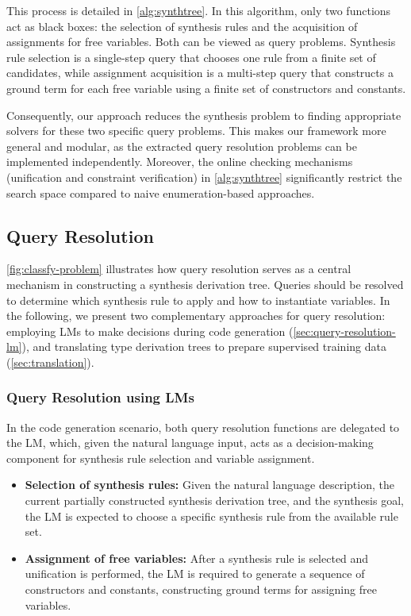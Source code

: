 This process is detailed in \autoref{alg:synthtree}. In this algorithm, only two functions act as black boxes: the selection of synthesis rules and the acquisition of assignments for free variables. Both can be viewed as query problems. Synthesis rule selection is a single-step query that chooses one rule from a finite set of candidates, while assignment acquisition is a multi-step query that constructs a ground term for each free variable using a finite set of constructors and constants.

Consequently, our approach reduces the synthesis problem to finding appropriate solvers for these two specific query problems. This makes our framework more general and modular, as the extracted query resolution problems can be implemented independently. 
Moreover, the online checking mechanisms (unification and constraint verification) in \autoref{alg:synthtree} significantly restrict the search space compared to naive enumeration-based approaches. 

\subsection{Query Resolution}
\autoref{fig:classfy-problem} illustrates how query resolution serves as a central mechanism in constructing a synthesis derivation tree. Queries should be resolved to determine which synthesis rule to apply and how to instantiate variables. In the following, we present two complementary approaches for query resolution: employing LMs to make decisions during code generation (\autoref{sec:query-resolution-lm}), and translating type derivation trees to prepare supervised training data (\autoref{sec:translation}).

\subsubsection{Query Resolution using LMs}
\label{sec:query-resolution-lm}
In the code generation scenario, both query resolution functions are delegated to the LM, which, given the natural language input, acts as a decision-making component for synthesis rule selection and variable assignment.

\begin{itemize}
  \item \textbf{Selection of synthesis rules:} Given the natural language description, the current partially constructed synthesis derivation tree, and the synthesis goal, the LM is expected to choose a specific synthesis rule from the available rule set.
  
  \item \textbf{Assignment of free variables:} After a synthesis rule is selected and unification is performed, the LM is required to generate a sequence of constructors and constants, constructing ground terms for assigning free variables. 
\end{itemize}

